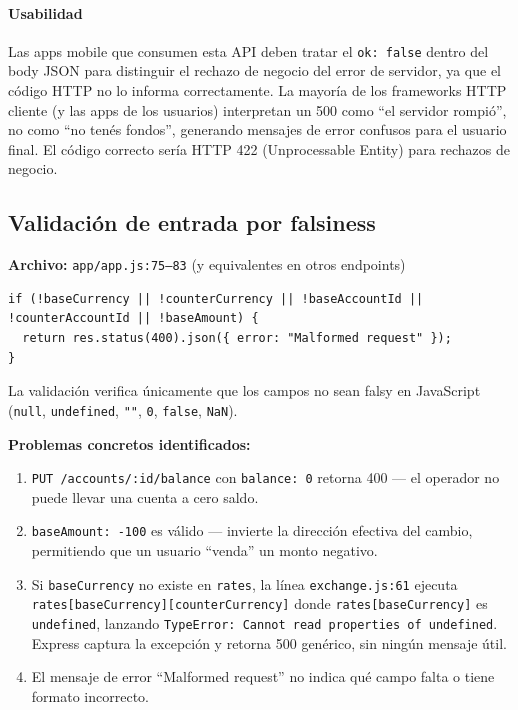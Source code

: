 \paragraph{Usabilidad}
Las apps mobile que consumen esta API deben tratar el \texttt{ok: false} dentro del body JSON para distinguir el rechazo de negocio del error de servidor, ya que el código HTTP no lo informa correctamente. La mayoría de los frameworks HTTP cliente (y las apps de los usuarios) interpretan un 500 como ``el servidor rompió'', no como ``no tenés fondos'', generando mensajes de error confusos para el usuario final. El código correcto sería HTTP 422 (Unprocessable Entity) para rechazos de negocio.

\subsection{Validación de entrada por falsiness}

\textbf{Archivo:} \texttt{app/app.js:75–83} (y equivalentes en otros endpoints)

\begin{verbatim}
if (!baseCurrency || !counterCurrency || !baseAccountId || !counterAccountId || !baseAmount) {
  return res.status(400).json({ error: "Malformed request" });
}
\end{verbatim}

La validación verifica únicamente que los campos no sean falsy en JavaScript (\texttt{null}, \texttt{undefined}, \texttt{""}, \texttt{0}, \texttt{false}, \texttt{NaN}).

\textbf{Problemas concretos identificados:}
\begin{enumerate}
    \item \texttt{PUT /accounts/:id/balance} con \texttt{balance: 0} retorna 400 — el operador no puede llevar una cuenta a cero saldo.
    \item \texttt{baseAmount: -100} es válido — invierte la dirección efectiva del cambio, permitiendo que un usuario ``venda'' un monto negativo.
    \item Si \texttt{baseCurrency} no existe en \texttt{rates}, la línea \texttt{exchange.js:61} ejecuta \texttt{rates[baseCurrency][counterCurrency]} donde \texttt{rates[baseCurrency]} es \texttt{undefined}, lanzando \texttt{TypeError: Cannot read properties of undefined}. Express captura la excepción y retorna 500 genérico, sin ningún mensaje útil.
    \item El mensaje de error ``Malformed request'' no indica qué campo falta o tiene formato incorrecto.
\end{enumerate}

